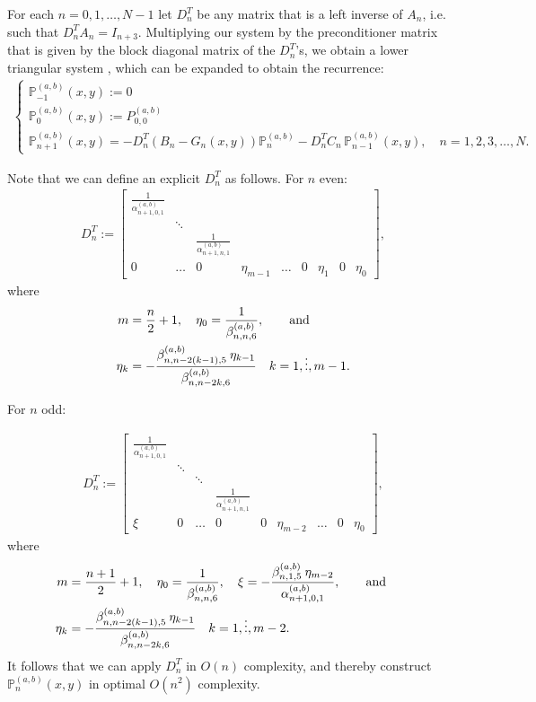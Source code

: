 \documentclass[11pt, oneside]{article}   	%
\newcommand{\bigP}{\mathbb{P}}
\newcommand{\alphaab}{\alpha^{(a,b)}}
\newcommand{\betaab}{\beta^{(a,b)}}
\newcommand{\bigPab}{\bigP^{(a,b)}}
\newcommand{\Dnt}{D^T_n}
\begin{document}
For each \(n = 0,1,\dots,N-1\) let \(\Dnt\) be any matrix that is a left inverse of \(A_n\), i.e. such that \(\Dnt A_n = I_{n+3}\). Multiplying our system by the preconditioner matrix that is given by the block diagonal matrix of the \(\Dnt\)'s, we obtain a lower triangular system \cite[p78]{dunkl2014orthogonal}, which can be expanded to obtain the recurrence:
\begin{align}
\begin{cases}
\bigPab_{-1}(x,y) := 0 \\
\bigPab_{0}(x,y) := P^{(a,b)}_{0,0} \\
\bigPab_{n+1}(x,y) = -\Dnt (B_n-G_n(x,y)) \bigPab_n - \Dnt C_n  \,\bigPab_{n-1}(x,y), \quad n = 1,2,3,\dots,N.
\end{cases}
\end{align}

Note that we can define an explicit \(\Dnt\) as follows. For \(n\) even:
\begin{align}
\Dnt := \begin{bmatrix}
		\frac{1}{\alphaab_{n+1,0,1}} & & &  \\
		& \ddots & & & \\
		& & \frac{1}{\alphaab_{n+1,n,1}} & \\
		0 & \hdots & 0 & \eta_{m-1} & \hdots & 0 & \eta_1 & 0 & \eta_0
	    \end{bmatrix},
\end{align}
where
\begin{align}
m &= \frac{n}{2} + 1, \quad \eta_0 = \frac{1}{\betaab_{n,n,6}},\qqand \nonumber \\
\eta_k &= -\frac{\betaab_{n,n-2(k-1),5} \: \eta_{k-1}}{\betaab_{n,n-2k,6}} \quad k = 1,\dots,m-1.
\end{align}

For \(n\) odd:

\begin{align}
\Dnt := \begin{bmatrix}
		\frac{1}{\alphaab_{n+1,0,1}} & &  \\
		& \ddots & & &  \\
		& & \ddots & & \\
		& & & \frac{1}{\alphaab_{n+1,n,1}} & \\
		\xi & 0 & \hdots & 0 & 0 & \eta_{m-2} & \hdots & 0 & \eta_0
	    \end{bmatrix},
\end{align}
 where
\begin{align}
m &= \frac{n+1}{2} + 1,\quad  \eta_0 = \frac{1}{\betaab_{n,n,6}}, \quad \xi = -\frac{\betaab_{n,1,5} \: \eta_{m-2}}{\alphaab_{n+1,0,1}},\qqand \nonumber \\
\eta_k &= -\frac{\betaab_{n,n-2(k-1),5} \: \eta_{k-1}}{\betaab_{n,n-2k,6}} \quad k = 1,\dots,m-2.
\end{align}
It follows that we can apply $D_n^T$ in $O(n)$ complexity, and thereby construct $\bigPab_{n}(x,y)$ in optimal $O(n^2)$ complexity.
\end{document}
